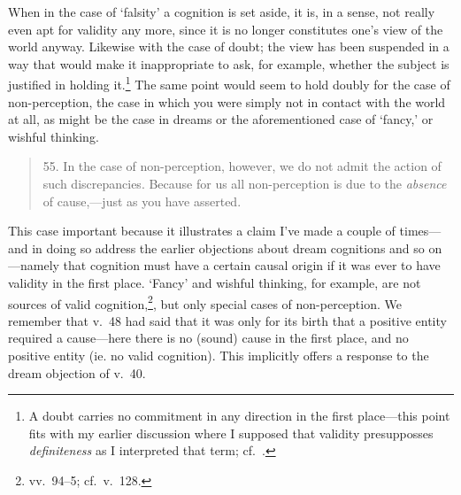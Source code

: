 ﻿\documentclass[11pt]{amsart}
\begin{document}
When in the case of `falsity' a cognition is set aside, it is, in a sense, not really even apt for validity any more, since it is no longer constitutes one's view of the world anyway. Likewise with the case of doubt; the view has been suspended in a way that would make it inappropriate to ask, for example, whether the subject is justified in holding it.\footnote{A doubt carries no commitment in any direction in the first place---this point fits with my earlier discussion where I supposed that validity presupposses \emph{definiteness} as I interpreted that term; cf.~\citet[pp.~93--5]{bhatt1962epistemology}.} The same point would seem to hold doubly for the case of non-perception, the case in which you were simply not in contact with the world at all, as might be the case in dreams or the aforementioned case of `fancy,' or wishful thinking.\small\begin{quote}55. In the case of non-perception, however, we do not admit the action of such discrepancies. Because for us all non-perception is due to the \emph{absence} of cause,---just as you have asserted.\end{quote}\normalsize This case important because it illustrates a claim I've made a couple of times---and in doing so address the earlier objections about dream cognitions and so on---namely that cognition must have a certain causal origin if it was ever to have validity in the first place. `Fancy' and wishful thinking, for example, are not sources of valid cognition,\footnote{vv.~94--5; cf.~v.~128.}, but only special cases of non-perception. We remember that v.~48 had said that it was only for its birth that a positive entity required a cause---here there is no (sound) cause in the first place, and no positive entity (ie. no valid cognition). This implicitly offers a response to the dream objection of v.~40.




\end{document}
